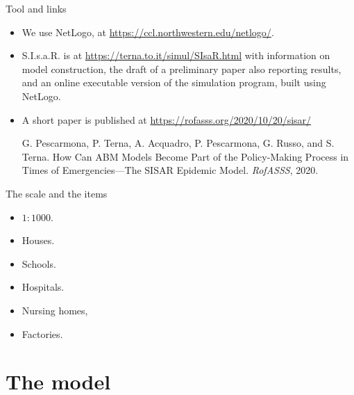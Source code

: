 \documentclass[8pt]{beamer}
\begin{document}
\begin{frame}{Tool and links}

  \begin{itemize}

\item We use NetLogo, at \url{https://ccl.northwestern.edu/netlogo/}.

 \medskip
 
 \item
 
S.I.s.a.R. is at \url{https://terna.to.it/simul/SIsaR.html} with information on model construction, the draft of a preliminary paper also reporting results, and an online executable version of the simulation program, built using NetLogo.

 \medskip
 
 \item
 A short paper is published at \url{https://rofasss.org/2020/10/20/sisar/}
 
 \medskip
 
 G. Pescarmona, P. Terna, A. Acquadro, P. Pescarmona, G. Russo, and S. Terna. How Can ABM Models Become Part of the Policy-Making Process in Times of Emergencies---The SISAR Epidemic Model. \emph{RofASSS}, 2020.

 \end{itemize}
\end{frame}

\begin{frame}{The scale and the items}

\begin{itemize}

\item $1:1000$.

\bigskip

\item Houses.
\item Schools.
\item Hospitals.
\item Nursing homes,
\item Factories.

\end{itemize}

\end{frame}
\section{The model}
\end{document}
